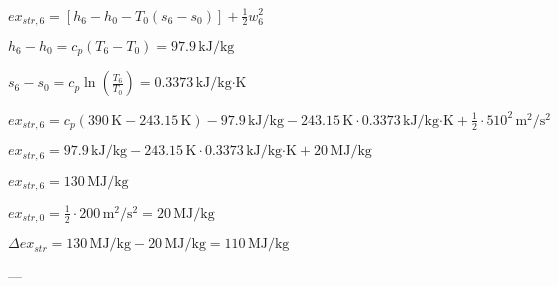 \( ex_{str,6} = [h_6 - h_0 - T_0 (s_6 - s_0)] + \frac{1}{2} w_6^2 \)  

\( h_6 - h_0 = c_p (T_6 - T_0) = 97.9 \, \text{kJ/kg} \)  

\( s_6 - s_0 = c_p \ln \left( \frac{T_6}{T_0} \right) = 0.3373 \, \text{kJ/kg·K} \)  

\( ex_{str,6} = c_p (390 \, \text{K} - 243.15 \, \text{K}) - 97.9 \, \text{kJ/kg} - 243.15 \, \text{K} \cdot 0.3373 \, \text{kJ/kg·K} + \frac{1}{2} \cdot 510^2 \, \text{m}^2/\text{s}^2 \)  

\( ex_{str,6} = 97.9 \, \text{kJ/kg} - 243.15 \, \text{K} \cdot 0.3373 \, \text{kJ/kg·K} + 20 \, \text{MJ/kg} \)  

\( ex_{str,6} = 130 \, \text{MJ/kg} \)  

\( ex_{str,0} = \frac{1}{2} \cdot 200 \, \text{m}^2/\text{s}^2 = 20 \, \text{MJ/kg} \)  

\( \Delta ex_{str} = 130 \, \text{MJ/kg} - 20 \, \text{MJ/kg} = 110 \, \text{MJ/kg} \)  

---